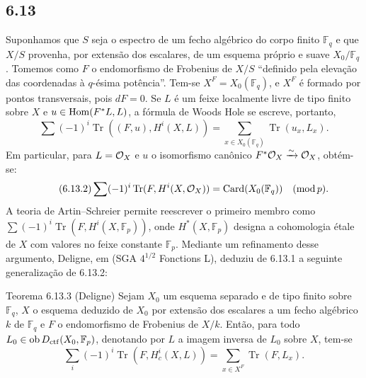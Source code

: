 \subsection*{6.13}
Suponhamos que $S$ seja o espectro de um fecho algébrico do corpo finito $\mathbb F_q$ e que $X/S$ provenha, por extensão dos escalares, de um esquema próprio e suave $X_0/\mathbb F_q$. Tomemos como $F$ o endomorfismo de Frobenius de $X/S$ ``definido pela elevação das coordenadas à $q$-\'esima potência''. Tem-se $X^F=X_0(\mathbb F_q)$, e $X^F$ é formado por pontos transversais, pois $dF=0$. Se $L$ é um feixe localmente livre de tipo finito sobre $X$ e $u\in\operatorname{Hom}(F^*L,L)$, a fórmula de Woods Hole se escreve, portanto,
\begin{equation}
\tag{6.13.1}
\sum(-1)^i\operatorname{Tr}((F,u),H^i(X,L))=
\sum_{x\in X_0(\mathbb F_q)}\operatorname{Tr}(u_x,L_x).
\end{equation}
Em particular, para $L=\mathcal{O}_X$ e $u$ o isomorfismo canônico $F^*\mathcal{O}_X\xrightarrow{\sim}\mathcal{O}_X$, obtém-se:
\begin{equation}
\tag{6.13.2}
\sum(-1)^i\operatorname{Tr}(F,H^i(X,\mathcal{O}_X))=\operatorname{Card}(X_0(\mathbb F_q))\quad(\operatorname{mod} p).
\end{equation}
A teoria de Artin--Schreier permite reescrever o primeiro membro como $\sum(-1)^i\operatorname{Tr}(F,H^i(X,\mathbb F_p))$, onde $H^*(X,\mathbb F_p)$ designa a cohomologia étale de $X$ com valores no feixe constante $\mathbb F_p$. Mediante um refinamento desse argumento, Deligne, em (SGA $4^{1/2}$ Fonctions L), deduziu de 6.13.1 a seguinte generalização de 6.13.2:


\begin{statement}{Teorema 6.13.3 (Deligne)}
Sejam $X_0$ um esquema separado e de tipo finito sobre $\mathbb F_q$, $X$ o esquema deduzido de $X_0$ por extensão dos escalares a um fecho algébrico $k$ de $\mathbb F_q$ e $F$ o endomorfismo de Frobenius de $X/k$. Então, para todo $L_0\in\operatorname{ob} D_{\mathrm{ctf}}(X_0,\mathbb F_p)$, denotando por $L$ a imagem inversa de $L_0$ sobre $X$, tem-se
\[
\sum_i(-1)^i\operatorname{Tr}(F,H_c^i(X,L))=
\sum_{x\in X^F}\operatorname{Tr}(F,L_x).
\]
\end{statement}

